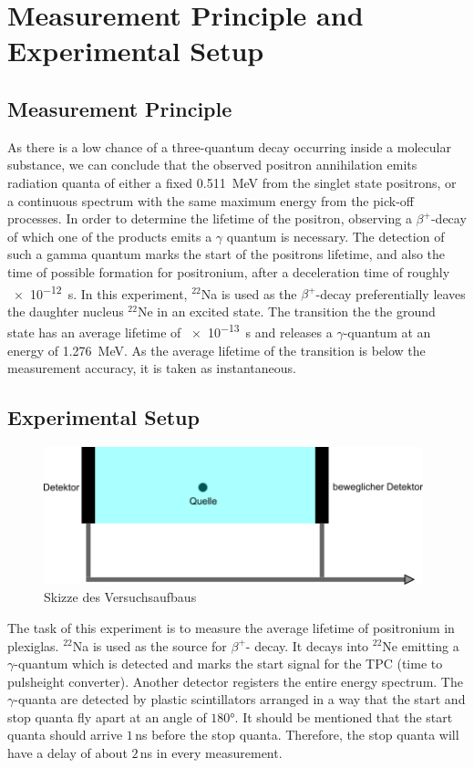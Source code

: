 \chapter{Measurement Principle and Experimental Setup}
\section{Measurement Principle}
As there is a low chance of a three-quantum decay occurring inside a molecular substance, we can conclude that the observed positron annihilation  emits radiation quanta of either a fixed \SI{0.511}{MeV} from the singlet state positrons, or a continuous spectrum with the same maximum energy from the pick-off processes.
In order to determine the lifetime of the positron, observing a $\beta^+$-decay of which one of the products emits a $\gamma$ quantum is necessary. The detection of such a gamma quantum marks the start of the positrons lifetime, and also the time of possible formation for positronium, after a deceleration time of roughly   
\SI{e-12}{s}. In this experiment, $^{22}$Na is used
as the $\beta^+$-decay preferentially leaves the daughter nucleus $^22$Ne in an excited state. The transition the the ground state has an average lifetime of \SI{e-13}{s} and releases a $\gamma$-quantum at an energy of \SI{1.276}{MeV}. As the average lifetime of the transition is below the measurement accuracy, it is taken as instantaneous. 

\section{Experimental Setup}

\begin{figure}[H]
    \centering
    \includegraphics[width=110mm,scale=0.5]{Positronium/include/path37.png}
    \caption{Skizze des Versuchsaufbaus} 
    \label{fig:Versuchsaufbau}
\end{figure}
\TODO \auf \englisch \ü\bersetzen 
The task of this experiment is to measure the average lifetime of positronium in plexiglas. $^{22}$Na is used as the source for $\beta ^{+}$- decay. It decays into $^{22}$Ne emitting a $\gamma$-quantum which is detected and marks the start signal for the TPC (time to pulsheight converter). Another detector registers the entire energy spectrum. The $\gamma$-quanta are detected by plastic scintillators arranged in a way that the start and stop quanta fly apart at an angle of $180$°. It should be mentioned that the start quanta should arrive $1\,$ns before the stop quanta. Therefore, the stop quanta will have a delay of about $2$\,ns in every measurement.